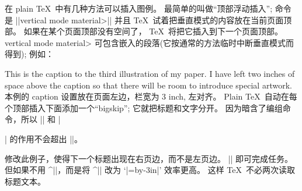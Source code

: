 \danger 在 plain \TeX\ 中有几种方法可以插入图例。%
最简单的叫做``顶部浮动插入'';
命令是
\begindisplay
|\topinsert|\<vertical mode material>|\endinsert|
\enddisplay
并且 \TeX\ 试着把垂直模式的内容放在当前页面顶部。%
如果在某个页面顶部没有空间了，
 \TeX\ 将把它插入到下一个页面顶部。%
\<vertical mode material> 可包含嵌入的段落(它按通常的方法临时中断垂直模式而得到);
例如：
\begintt
\topinsert \vskip 2in
\hsize=3in \raggedright
{} This is the caption to the
third illustration of my paper. I have left two inches
of space above the caption so that there will be room
to introduce special artwork. \endinsert
\endtt
本例的 caption 设置放在页面左边，栏宽为 3 inch, 左对齐。%
Plain \TeX\ 自动在每个顶部插入下面添加一个``bigskip'';
它就把标题和文字分开。%
因为暗含了编组命令，所以 |\hsize=3in| 和 |\raggedright| 的作用不会超出 |\endinsert|。

\dangerexercise 修改此例子，使得下一个标题出现在右页边，而不是左页边。
\answer |\topinsert\vskip2in\endinsert| 即可完成任务。
但如果不用 ^|\rightline|，而是将 ^|\leftskip| 改为
`|\leftskip=\hsize \advance\leftskip by-3in|' 效率更高。
这样 \TeX\ 不必两次读取标题文本。

